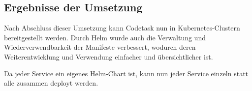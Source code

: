\subsection{Ergebnisse der Umsetzung}

Nach Abschluss dieser Umsetzung kann Codetask nun in Kubernetes-Clustern bereitgestellt werden. Durch Helm wurde auch die Verwaltung und Wiederverwendbarkeit der Manifeste verbessert, wodurch deren Weiterentwicklung und Verwendung einfacher und übersichtlicher ist.

Da jeder Service ein eigenes Helm-Chart ist, kann nun jeder Service einzeln statt alle zusammen deployt werden.
